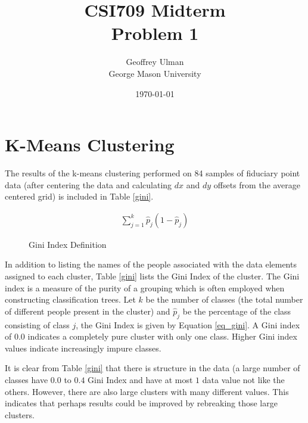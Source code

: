 \documentclass[12pt]{article}
\begin{document}
\title{CSI709 Midterm \\
Problem 1}
\author{
        Geoffrey Ulman \\
        George Mason University\\
}
\date{\today}

\maketitle

\section{K-Means Clustering}

The results of the k-means clustering performed on 84 samples of fiduciary point data (after centering the data and calculating \(dx\) and \(dy\) offsets from the average centered grid) is included in Table \ref{gini}.

\begin{figure}
\begin{equation}\label{eq_gini}
\begin{aligned}
\sum_{j=1}^{k} \hat{p}_j\left ( 1 - \hat{p}_j \right )
\end{aligned}
\end{equation}
\caption{Gini Index Definition}
\end{figure}

In addition to listing the names of the people associated with the data elements assigned to each cluster, Table \ref{gini} lists the Gini Index of the cluster. The Gini index is a measure of the purity of a grouping which is often employed when constructing classification trees. Let \(k\) be the number of classes (the total number of different people present in the cluster) and \(\hat{p}_j\) be the percentage of the class consisting of class \(j\), the Gini Index is given by Equation \ref{eq_gini}. A Gini index of \(0.0\) indicates a completely pure cluster with only one class. Higher Gini index values indicate increasingly impure classes.

It is clear from Table \ref{gini} that there is structure in the data (a large number of classes have \(0.0\) to \(0.4\) Gini Index and have at most \(1\) data value not like the others. However, there are also large clusters with many different values. This indicates that perhaps results could be improved by rebreaking those large clusters.
\end{document}
